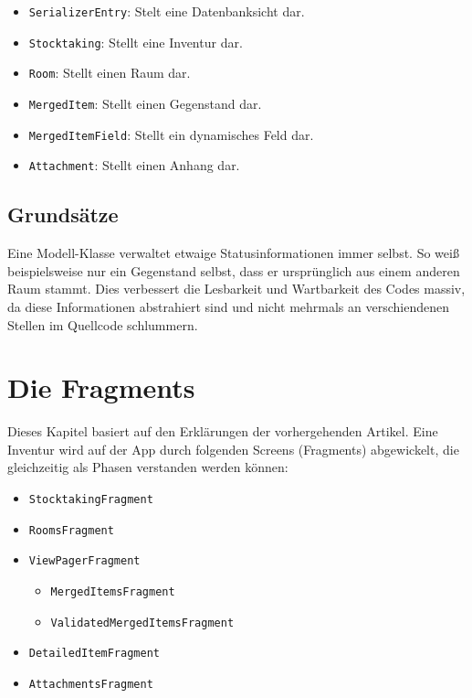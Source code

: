 \begin{itemize}
\tightlist
\item
  \texttt{SerializerEntry}: Stelt eine Datenbanksicht dar.
\item
  \texttt{Stocktaking}: Stellt eine Inventur dar.
\item
  \texttt{Room}: Stellt einen Raum dar.
\item
  \texttt{MergedItem}: Stellt einen Gegenstand dar.
\item
  \texttt{MergedItemField}: Stellt ein dynamisches Feld dar.
\item
  \texttt{Attachment}: Stellt einen Anhang dar.
\end{itemize}

\hypertarget{grundsuxe4tze}{%
\subsection{Grundsätze}\label{grundsuxe4tze}}

Eine Modell-Klasse verwaltet etwaige Statusinformationen immer selbst.
So weiß beispielsweise nur ein Gegenstand selbst, dass er ursprünglich
aus einem anderen Raum stammt. Dies verbessert die Lesbarkeit und
Wartbarkeit des Codes massiv, da diese Informationen abstrahiert sind
und nicht mehrmals an verschiendenen Stellen im Quellcode schlummern.

\hypertarget{die-fragments}{%
\section{Die Fragments}\label{die-fragments}}

Dieses Kapitel basiert auf den Erklärungen der vorhergehenden Artikel.
Eine Inventur wird auf der App durch folgenden Screens (Fragments)
abgewickelt, die gleichzeitig als Phasen verstanden werden können:

\begin{itemize}
\tightlist
\item
  \texttt{StocktakingFragment}
\item
  \texttt{RoomsFragment}
\item
  \texttt{ViewPagerFragment}

  \begin{itemize}
  \tightlist
  \item
    \texttt{MergedItemsFragment}
  \item
    \texttt{ValidatedMergedItemsFragment}
  \end{itemize}
\item
  \texttt{DetailedItemFragment}
\item
  \texttt{AttachmentsFragment}
\end{itemize}

